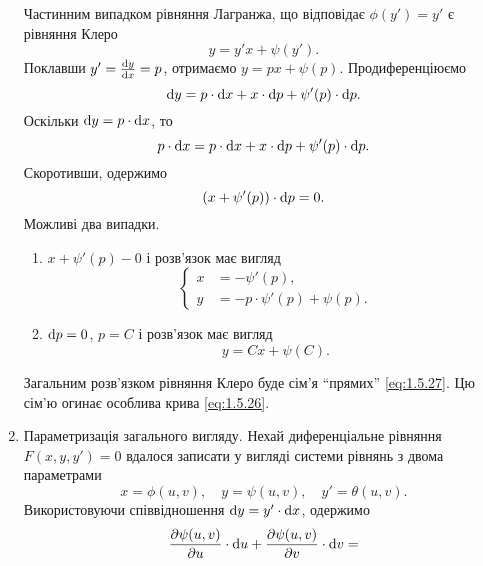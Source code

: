 \begin{enumerate}
	Частинним випадком рівняння Лагранжа, що відповідає $\phi(y') = y'$ є рівняння Клеро
 	\begin{equation}
 		\label{eq:1.5.23}
 		y = y' x + \psi(y').
 	\end{equation}
	Поклавши $y' = \frac{\mathop{}\!\mathrm{d} y}{\mathop{}\!\mathrm{d} x} = p$, отримаємо $y = p x + \psi(p)$. Продиференціюємо 
	\begin{equation}
		\label{eq:1.5.24}
		\mathop{}\!\mathrm{d} y = p \cdot \mathop{}\!\mathrm{d} x + x \cdot \mathop{}\!\mathrm{d} p + \psi'(p) \cdot \mathop{}\!\mathrm{d} p.
	\end{equation}
	Оскільки $\mathop{}\!\mathrm{d} y = p \cdot \mathop{}\!\mathrm{d} x$, то
	\begin{equation}
		\label{eq:1.5.25}
		p \cdot \mathop{}\!\mathrm{d} x = p \cdot \mathop{}\!\mathrm{d} x + x \cdot \mathop{}\!\mathrm{d} p + \psi'(p) \cdot \mathop{}\!\mathrm{d} p.
	\end{equation}
	Скоротивши, одержимо
	\begin{equation}
		\label{eq:1.5.25}
		(x + \psi'(p)) \cdot \mathop{}\!\mathrm{d} p = 0.
	\end{equation}
	Можливі два випадки.
	\begin{enumerate}
		\item $x + \psi'(p) - 0$ і розв’язок має вигляд
		\begin{equation}
			\label{eq:1.5.26}
			\left\{\begin{aligned}
				x &= - \psi'(p), \\
				y &= -p \cdot \psi'(p) + \psi(p).
			\end{aligned}\right.
		\end{equation}
		\item $\mathop{}\!\mathrm{d} p = 0$, $p = C$ і розв’язок має вигляд
		\begin{equation}
			\label{eq:1.5.27}
			y = C x + \psi(C).
		\end{equation}
	\end{enumerate}
	Загальним розв’язком рівняння Клеро буде сім’я ``прямих'' \eqref{eq:1.5.27}. Цю сім’ю огинає особлива крива \eqref{eq:1.5.26}.
	\item Параметризація загального вигляду. Нехай диференціальне рівняння $F(x, y, y') = 0$ вдалося записати у вигляді системи рівнянь з двома параметрами
	\begin{equation}
		\label{eq:1.5.28}
		x = \phi(u, v), \quad y = \psi(u, v), \quad y' = \theta(u, v).	
	\end{equation}
	Використовуючи співвідношення $\mathop{}\!\mathrm{d} y = y' \cdot \mathop{}\!\mathrm{d} x$, одержимо
	\begin{multline}
		\label{eq:1.5.29}
		\frac{\partial \psi(u,v)}{\partial u} \cdot \diff u + \frac{\partial \psi(u, v)}{\partial v} \cdot \diff v = \\

\end{multline}
\end{enumerate}
